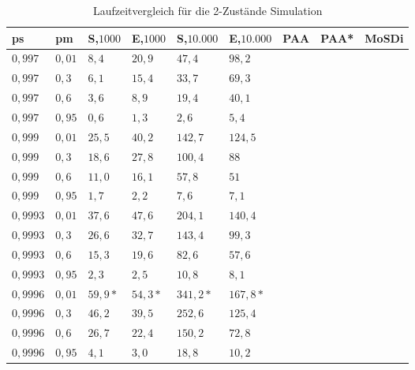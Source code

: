 \begin{table}[h]
\centering
\caption{Laufzeitvergleich für die 2-Zustände Simulation}
\label{2s_laufzeit}
\begin{tabular}{|l|l||l|l|l|l|l|l|l|} \hline
ps     & pm   & S,$1000$ & E,$1000$ & S,$10.000$ & E,$10.000$ & PAA & PAA* & MoSDi \\ \hline \hline
$0,997  $ & $ 0,01 $ & $ 8,4  $ & $ 20,9  $ & $ 47,4  $ & $98,2  $ & $  $ & $ $ & $  $\\ \hline
$0,997  $ & $ 0,3  $ & $ 6,1  $ & $ 15,4  $ & $ 33,7  $ & $69,3  $ & $  $ & $ $ & $  $\\ \hline
$0,997  $ & $ 0,6  $ & $ 3,6  $ & $ 8,9   $  & $ 19,4 $ & $40,1  $ & $  $ & $ $ & $  $\\ \hline
$0,997  $ & $ 0,95 $ & $ 0,6  $ & $ 1,3   $  & $ 2,6  $ & $5,4   $ & $  $ & $ $ & $  $\\ \hline
$0,999  $ & $ 0,01 $ & $ 25,5 $ & $ 40,2  $ & $ 142,7 $ & $124,5 $ & $  $ & $ $ & $  $\\ \hline
$0,999  $ & $ 0,3  $ & $ 18,6 $ & $ 27,8  $ & $ 100,4 $ & $88    $ & $  $ & $ $ & $  $\\ \hline
$0,999  $ & $ 0,6  $ & $ 11,0 $ & $ 16,1  $ & $ 57,8  $ & $51    $ & $  $ & $ $ & $  $\\ \hline
$0,999  $ & $ 0,95 $ & $ 1,7  $ & $ 2,2   $ & $ 7,6   $ & $7,1   $ & $  $ & $ $ & $  $\\ \hline
$0,9993 $ & $ 0,01 $ & $ 37,6 $ & $ 47,6  $ & $ 204,1 $ & $140,4 $ & $  $ & $ $ & $  $\\ \hline
$0,9993 $ & $ 0,3  $ & $ 26,6 $ & $ 32,7  $ & $ 143,4 $ & $99,3  $ & $  $ & $ $ & $  $\\ \hline
$0,9993 $ & $ 0,6  $ & $ 15,3 $ & $ 19,6  $ & $ 82,6  $ & $57,6  $ & $  $ & $ $ & $  $\\ \hline
$0,9993 $ & $ 0,95 $ & $ 2,3  $ & $ 2,5   $ & $ 10,8  $ & $8,1   $ & $  $ & $ $ & $  $\\ \hline
$0,9996 $ & $ 0,01 $ & $ 59,9*$ & $ 54,3* $ & $341,2* $ & $167,8*$ & $  $ & $ $ & $  $\\ \hline
$0,9996 $ & $ 0,3  $ & $ 46,2 $ & $ 39,5  $ & $ 252,6 $ & $125,4 $ & $  $ & $ $ & $  $\\ \hline
$0,9996 $ & $ 0,6  $ & $ 26,7 $ & $ 22,4  $ & $ 150,2 $ & $72,8  $ & $  $ & $ $ & $  $\\ \hline
$0,9996 $ & $ 0,95 $ & $ 4,1  $ & $ 3,0   $ & $ 18,8  $ & $10,2  $ & $  $ & $ $ & $  $\\ \hline
\end{tabular}
\end{table}

